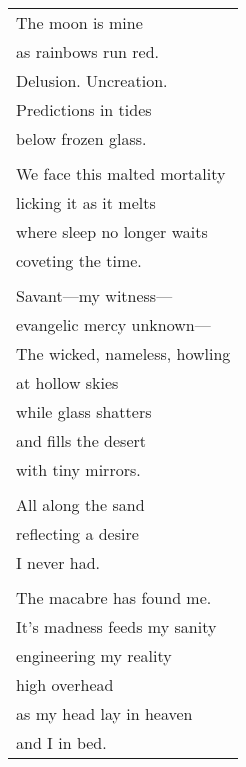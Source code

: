 \documentclass{article}
\begin{document}
\begin{center}
\begin{tabular}{l}
The moon is mine \\
as rainbows run red. \\
Delusion. Uncreation. \\
Predictions in tides \\
below frozen glass. \\
\\
We face this malted mortality \\
licking it as it melts \\
where sleep no longer waits \\
coveting the time. \\
\\
Savant---my witness--- \\
evangelic mercy unknown--- \\
The wicked, nameless, howling \\
at hollow skies \\
while glass shatters \\
and fills the desert \\
with tiny mirrors. \\
\\
All along the sand \\
reflecting a desire \\
I never had. \\
\\
The macabre has found me. \\
It's madness feeds my sanity \\
engineering my reality \\
high overhead \\
as my head lay in heaven \\
and I in bed. \\
\end{tabular}
\end{center}
\end{document}

